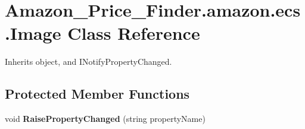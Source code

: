 \hypertarget{class_amazon___price___finder_1_1amazon_1_1ecs_1_1_image}{\section{Amazon\-\_\-\-Price\-\_\-\-Finder.\-amazon.\-ecs.\-Image Class Reference}
\label{class_amazon___price___finder_1_1amazon_1_1ecs_1_1_image}
}


 




Inherits object, and I\-Notify\-Property\-Changed.

\subsection*{Protected Member Functions}
\begin{DoxyCompactItemize}
\item 
\hypertarget{class_amazon___price___finder_1_1amazon_1_1ecs_1_1_image_a8173ab3477a4451faa68c48cfa0bb1d0}{void {\bfseries Raise\-Property\-Changed} (string property\-Name)}\label{class_amazon___price___finder_1_1amazon_1_1ecs_1_1_image_a8173ab3477a4451faa68c48cfa0bb1d0}

\end{DoxyCompactItemize}
